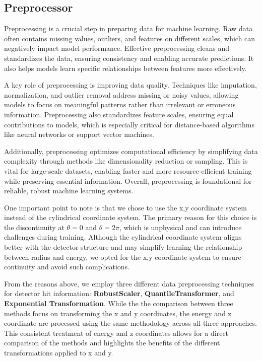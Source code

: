 \subsection{Preprocessor}

Preprocessing is a crucial step in preparing data for machine learning. Raw data often contains missing values, outliers, and features on different scales, which can negatively impact model performance. Effective preprocessing cleans and standardizes the data, ensuring consistency and enabling accurate predictions. It also helps models learn specific relationships between features more effectively.

A key role of preprocessing is improving data quality. Techniques like imputation, normalization, and outlier removal address missing or noisy values, allowing models to focus on meaningful patterns rather than irrelevant or erroneous information. Preprocessing also standardizes feature scales, ensuring equal contributions to models, which is especially critical for distance-based algorithms like neural networks or support vector machines.

Additionally, preprocessing optimizes computational efficiency by simplifying data complexity through methods like dimensionality reduction or sampling. This is vital for large-scale datasets, enabling faster and more resource-efficient training while preserving essential information. Overall, preprocessing is foundational for reliable, robust machine learning systems.

One important point to note is that we chose to use the x,y coordinate system instead of the cylindrical coordinate system. The primary reason for this choice is the discontinuity at $\theta=0$ and $\theta=2\pi$, which is unphysical and can introduce challenges during training. Although the cylindrical coordinate system aligns better with the detector structure and may simplify learning the relationship between radius and energy, we opted for the x,y coordinate system to ensure continuity and avoid such complications. 

From the reasons above, we employ three different data preprocessing techniques for detector hit information: \textbf{RobustScaler}, \textbf{QuantileTransformer}, and \textbf{Exponential Transformation}. While the the comparison between three methods focus on transforming the x and y coordinates, the energy and z coordinate are processed using the same methodology across all three approaches. This consistent treatment of energy and z coordinates allows for a direct comparison of the methods and highlights the benefits of the different transformations applied to x and y.

